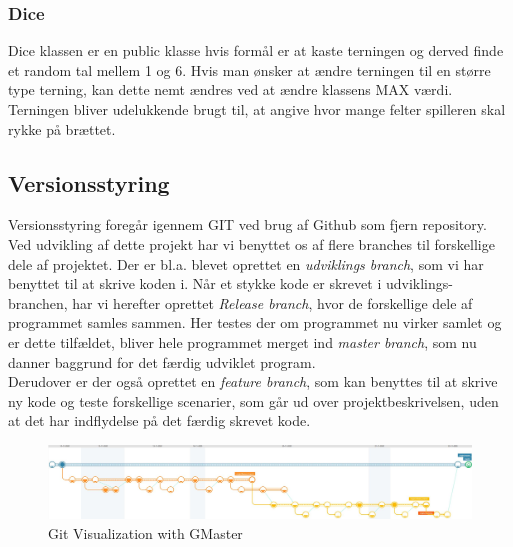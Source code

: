 \subsubsection{Dice}
Dice klassen er en public klasse hvis formål er at kaste terningen og derved finde et random tal mellem 1 og 6. Hvis man ønsker at ændre terningen til en større type terning, kan dette nemt ændres ved at ændre klassens MAX værdi. Terningen bliver udelukkende brugt til, at angive hvor mange felter spilleren skal rykke på brættet.

 

\subsection{Versionsstyring}
Versionsstyring foregår igennem GIT ved brug af Github som fjern repository. Ved udvikling af dette projekt har vi benyttet os af flere branches til forskellige dele af projektet. Der er bl.a. blevet oprettet en \emph{udviklings branch}, som vi har benyttet til at skrive koden i. Når et stykke kode er skrevet i udviklings-branchen, har vi herefter oprettet \emph{Release branch}, hvor de forskellige dele af programmet samles sammen. Her testes der om programmet nu virker samlet og er dette tilfældet, bliver hele programmet merget ind \emph{master branch}, som nu danner baggrund for det færdig udviklet program.
\\Derudover er der også oprettet en \emph{feature branch}, som kan benyttes til at skrive ny kode og teste forskellige scenarier, som går ud over projektbeskrivelsen, uden at det har indflydelse på det færdig skrevet kode.

\begin{figure}[H]
        \centering
        \includegraphics[width=17cm]{figures/gitVisualize.JPG}
        \caption{Git Visualization with GMaster}
    \end{figure}
    